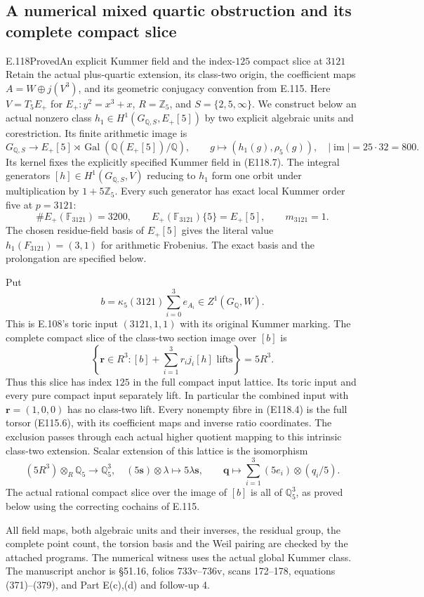 \subsection{A numerical mixed quartic obstruction and its complete compact slice}

\begin{statement}{E.118}{Proved}{An explicit Kummer field and the index-$125$ compact slice at $3121$}
Retain the actual plus-quartic extension, its class-two origin,
the coefficient maps $A=W\oplus j(V^3)$, and its geometric
conjugacy convention from E.115. Here $V=T_5E_+$ for
$E_+:y^2=x^3+x$, $R=\mathbb Z_5$, and
$S=\{2,5,\infty\}$. We construct below an actual nonzero
class $h_1\in H^1(G_{\mathbb Q,S},E_+[5])$ by two explicit
algebraic units and corestriction. Its finite arithmetic image is
\[
 G_{\mathbb Q,S}\longrightarrow E_+[5]\rtimes
                \operatorname{Gal}(\mathbb Q(E_+[5])/\mathbb Q),
 \qquad g\longmapsto(h_1(g),\rho_5(g)),
 \quad |\operatorname{im}|=25\cdot32=800.
 \tag{E118.1}
\]
Its kernel fixes the explicitly specified Kummer field in
(E118.7). The integral generators $[h]\in H^1(G_{\mathbb Q,S},V)$
reducing to $h_1$ form one orbit under multiplication by
$1+5\mathbb Z_5$. Every such generator has exact local
Kummer order five at $p=3121$:
\[
  \#E_+(\mathbb F_{3121})=3200,
  \qquad E_+(\mathbb F_{3121})\{5\}=E_+[5],
  \qquad m_{3121}=1.
 \tag{E118.2}
\]
The chosen residue-field basis of $E_+[5]$ gives the
literal value $h_1(F_{3121})=(3,1)$ for arithmetic Frobenius.
The exact basis and the prolongation are specified below.

Put
\[
 b=\kappa_5(3121)\sum_{i=0}^{3}e_{A_i}\in Z^1(G_{\mathbb Q},W).
 \tag{E118.3}
\]
This is E.108's toric input $(3121,1,1)$ with its original
Kummer marking. The complete compact slice of the class-two
section image over $[b]$ is
\[
 \left\{\mathbf r\in R^3:
     [b]+\sum_{i=1}^3r_i j_i[h]\text{ lifts}\right\}=5R^3.
 \tag{E118.4}
\]
Thus this slice has index $125$ in the full compact input
lattice. Its toric input and every pure compact input separately
lift. In particular the combined input with
$\mathbf r=(1,0,0)$ has no class-two lift. Every nonempty
fibre in (E118.4) is the full torsor (E115.6), with its
coefficient maps and inverse ratio coordinates. The exclusion
passes through each actual higher quotient mapping to this
intrinsic class-two extension. Scalar extension of this lattice is
the isomorphism
\[
 (5R^3)\otimes_R\mathbb Q_5\longrightarrow\mathbb Q_5^3,
 \quad (5\mathbf s)\otimes\lambda\longmapsto5\lambda\mathbf s,
 \qquad
 \mathbf q\longmapsto\sum_{i=1}^3(5e_i)\otimes(q_i/5).
\]
The actual rational compact slice over the image of $[b]$
is all of $\mathbb Q_5^3$, as proved below using the correcting
cochains of E.115.

All field maps, both algebraic units and their inverses,
the residual group, the complete point count, the torsion
basis and the Weil pairing are checked by the attached
programs. The numerical witness uses the actual global
Kummer class. The manuscript anchor is \S51.16, folios
733v--736v, scans 172--178, equations (371)--(379), and
Part E(c),(d) and follow-up 4.
\end{statement}

